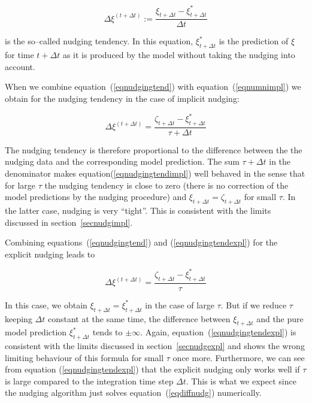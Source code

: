 \begin{appendix}
\begin{equation}\label{eqnudgingtend}
\Delta\xi^{(t+\Delta t)}:=\frac{\xi_{t+ \Delta t}-\xi^\ast_{t+\Delta t}}{\Delta t}
\end{equation}

is the so--called nudging tendency. In this equation,
$\xi^\ast_{t+\Delta t}$ is the prediction of $\xi$ for time $t+\Delta t$
as it is produced by the model without taking the nudging into
account. 

When we combine equation~(\ref{eqnudgingtend}) with
equation~(\ref{eqnumnimpl}) we obtain for the nudging tendency in the
case of implicit nudging:

\begin{equation}\label{eqnudgingtendimpl}
\Delta\xi^{(t+\Delta t)}=\frac{\zeta_{t+\Delta t}-\xi^\ast_{t+\Delta
    t}}{\tau +\Delta t}
\end{equation}

The nudging tendency is therefore proportional to the difference
between the the nudging data and the corresponding model
prediction. The sum $\tau+\Delta t$ in the denominator makes 
equation(\ref{eqnudgingtendimpl}) well behaved in the sense that for
large $\tau$ the nudging tendency is close to zero (there is no
correction of the model predictions by the nudging procedure) and
$\xi_{t+\Delta t}=\zeta_{t+\Delta t}$ for small $\tau$. In the latter
case, nudging is very ``tight''. This is consistent with the limits
discussed in section~\ref{secnudgimpl}.

Combining equations~(\ref{eqnudgingtend}) and
(\ref{eqnudgingtendexpl}) for the explicit nudging leads to

\begin{equation}\label{eqnudgingtendexpl}
\Delta\xi^{(t+\Delta t)}=\frac{\zeta_{t+\Delta t}-\xi^\ast_{t+\Delta t}}{\tau}
\end{equation}

In this case, we obtain $\xi_{t+\Delta t}=\xi^\ast_{t+\Delta t}$ in
the case of large $\tau$. But if we reduce $\tau$ keeping $\Delta t$
constant at the same time, the difference between $\xi_{t+\Delta t}$
and the pure model prediction $\xi^\ast_{t+\Delta t}$ tends to $\pm
\infty$.
Again, equation~(\ref{eqnudgingtendexpl}) is consistent with the
limits discussed in section~\ref{secnudgexpl} and shows the wrong
limiting behaviour of this formula for small $\tau$ once more.
Furthermore, we can see from equation (\ref{eqnudgingtendexpl}) that
the explicit nudging only works well if $\tau$ is large compared to
the integration time step $\Delta t$. This is what we expect since
the nudging algorithm just solves
equation~(\ref{eqdiffnudg}) numerically.


\end{appendix}
